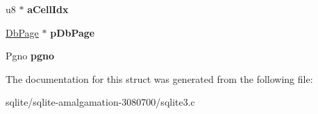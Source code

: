 \begin{DoxyCompactItemize}
\item 
\hypertarget{struct_mem_page_a6f391f110e68ede6e5234b4e9f678f99}{u8 $\ast$ {\bfseries a\+Cell\+Idx}}\label{struct_mem_page_a6f391f110e68ede6e5234b4e9f678f99}

\item 
\hypertarget{struct_mem_page_add322c1aed91e95d8dfe3ac3535d65b4}{\hyperlink{struct_pg_hdr}{Db\+Page} $\ast$ {\bfseries p\+Db\+Page}}\label{struct_mem_page_add322c1aed91e95d8dfe3ac3535d65b4}

\item 
\hypertarget{struct_mem_page_ad2b0c532abc799bbcf3b43df4f0b0546}{Pgno {\bfseries pgno}}\label{struct_mem_page_ad2b0c532abc799bbcf3b43df4f0b0546}

\end{DoxyCompactItemize}


The documentation for this struct was generated from the following file\+:\begin{DoxyCompactItemize}
\item 
sqlite/sqlite-\/amalgamation-\/3080700/sqlite3.\+c\end{DoxyCompactItemize}
